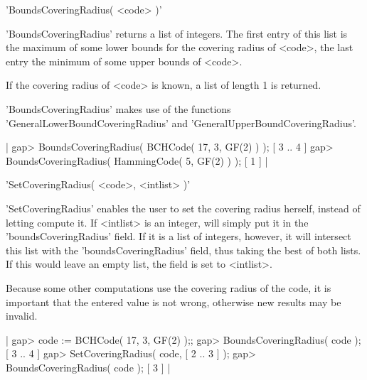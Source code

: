 

'BoundsCoveringRadius( <code> )'

'BoundsCoveringRadius' returns a list of integers.
The first entry of this list is the maximum of some lower bounds
for the covering radius of <code>,
the last entry the minimum of some upper bounds of <code>.

If the covering radius of <code> is known, a list of length 1 is
returned.

'BoundsCoveringRadius' makes use of the functions
'GeneralLowerBoundCoveringRadius' and
'GeneralUpperBoundCoveringRadius'.

|    gap> BoundsCoveringRadius( BCHCode( 17, 3, GF(2) ) );
    [ 3 .. 4 ]
    gap> BoundsCoveringRadius( HammingCode( 5, GF(2) ) );
    [ 1 ] |




'SetCoveringRadius( <code>, <intlist> )'

'SetCoveringRadius' enables the user to set the covering radius
herself, instead of letting \GUAVA{} compute it.
If <intlist> is an integer, \GUAVA{} will simply put it in
the \\ 'boundsCoveringRadius' field.
If it is a list of integers, however, it will intersect this list
with the 'boundsCoveringRadius' field, thus taking the best of both
lists.
If this would leave an empty list, the field is set to <intlist>.

Because some other computations use the covering radius of the code,
it is important that the entered value is not wrong, otherwise
new results may be invalid.

|    gap> code := BCHCode( 17, 3, GF(2) );;
    gap> BoundsCoveringRadius( code );
    [ 3 .. 4 ]
    gap> SetCoveringRadius( code, [ 2 .. 3 ] );
    gap> BoundsCoveringRadius( code );
    [ 3 ]  |



